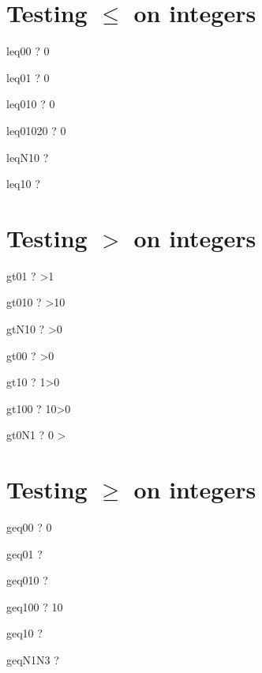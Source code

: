 \documentclass{article}
\begin{document}
\section{Testing $\leq$ on integers}
\begin{theorem}{leq00}  \vdash?   0  \end{theorem}
\begin{theorem}{leq01}  \vdash?   0  \end{theorem}
\begin{theorem}{leq010} \vdash?   0  \end{theorem}
\begin{theorem}{leq01020} \vdash?   0   \end{theorem}
\begin{theorem}{leqN10} \vdash?     \end{theorem}
\begin{theorem}{leq10}  \vdash?     \end{theorem}

\section{Testing $>$ on integers}
\begin{theorem}{gt01}  \vdash?   >1 \end{theorem}
\begin{theorem}{gt010} \vdash?   >10 \end{theorem}
\begin{theorem}{gtN10} \vdash?   \lnot {}>0 \end{theorem}
\begin{theorem}{gt00}  \vdash?   >0 \end{theorem}
\begin{theorem}{gt10}  \vdash?   1>0 \end{theorem}
\begin{theorem}{gt100} \vdash?   10>0 \end{theorem}
\begin{theorem}{gt0N1} \vdash?   0 >  \end{theorem}

\section{Testing $\geq$ on integers}
\begin{theorem}{geq00} \vdash?         0  \end{theorem}
\begin{theorem}{geq01} \vdash?     \end{theorem}
\begin{theorem}{geq010} \vdash?    \end{theorem}
\begin{theorem}{geq100} \vdash?        10  \end{theorem}
\begin{theorem}{geq10} \vdash?   \lnot {}  \end{theorem}
\begin{theorem}{geqN1N3} \vdash?        \geq {} \end{theorem}
\end{document}
